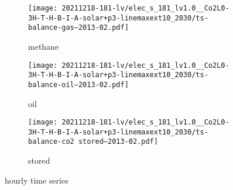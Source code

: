 \begin{figure}
    \centering
    \begin{subfigure}[t]{\textwidth}
        \centering
        \caption{methane}
        \texttt{[image: 20211218-181-lv/elec\_s\_181\_lv1.0\_\_Co2L0-3H-T-H-B-I-A-solar+p3-linemaxext10\_2030/ts-balance-gas--2013-02.pdf]}
    \end{subfigure}
    \begin{subfigure}[t]{\textwidth}
        \centering
        \caption{oil}
        \texttt{[image: 20211218-181-lv/elec\_s\_181\_lv1.0\_\_Co2L0-3H-T-H-B-I-A-solar+p3-linemaxext10\_2030/ts-balance-oil--2013-02.pdf]}
    \end{subfigure}
    \begin{subfigure}[t]{\textwidth}
        \centering
        \caption{stored \co}
        \texttt{[image: 20211218-181-lv/elec\_s\_181\_lv1.0\_\_Co2L0-3H-T-H-B-I-A-solar+p3-linemaxext10\_2030/ts-balance-co2 stored--2013-02.pdf]}
    \end{subfigure}
    \caption{hourly time series}
    \label{fig:output-ts-4}
\end{figure}